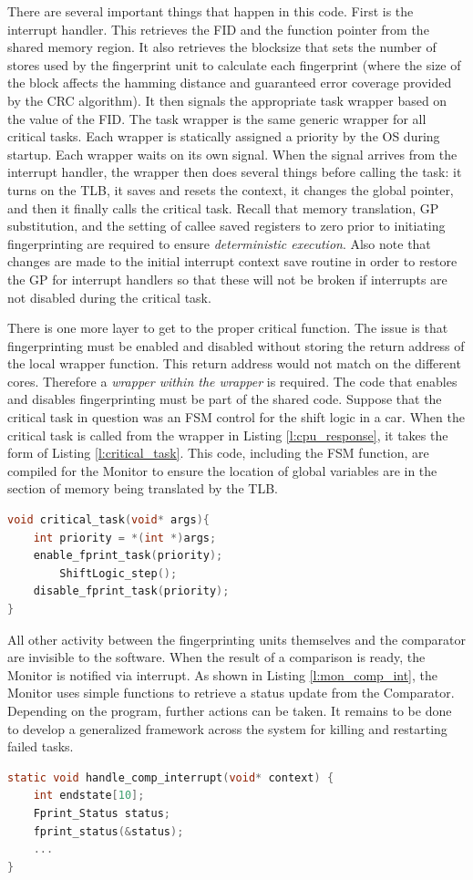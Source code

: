 There are several important things that happen in this code. First is the interrupt handler. This retrieves the FID and the function pointer from the shared memory region. It also retrieves the blocksize that sets the number of stores used by the fingerprint unit to calculate each fingerprint (where the size of the block affects the hamming distance and guaranteed error coverage provided by the CRC algorithm). It then signals the appropriate task wrapper based on the value of the FID. The task wrapper is the same generic wrapper for all critical tasks. Each wrapper is statically assigned a priority by the OS during startup. Each wrapper waits on its own signal. When the signal arrives from the interrupt handler, the wrapper then does several things before calling the task: it turns on the TLB, it saves and resets the context, it changes the global pointer, and then it finally calls the critical task. Recall that memory translation, GP substitution, and the setting of callee saved registers to zero prior to initiating fingerprinting are required to ensure \emph{deterministic execution}. Also note that changes are made to the initial interrupt context save routine in order to restore the GP for interrupt handlers so that these will not be broken if interrupts are not disabled during the critical task.

There is one more layer to get to the proper critical function. The issue is that fingerprinting must be enabled and disabled without storing the return address of the local wrapper function. This return address would not match on the different cores. Therefore a \emph{wrapper within the wrapper} is required. The code that enables and disables fingerprinting must be part of the shared code. Suppose that the critical task in question was an FSM control for the shift logic in a car. When the critical task is called from the wrapper in Listing \ref{l:cpu_response}, it takes the form of Listing \ref{l:critical_task}. This code, including the FSM function, are compiled for the Monitor to ensure the location of global variables are in the section of memory being translated by the TLB.

\begin{lstlisting}[frame=single,language=C,label=l:critical_task,caption=The inner layer wrapper.]
void critical_task(void* args){
	int priority = *(int *)args;
	enable_fprint_task(priority);
	    ShiftLogic_step();
	disable_fprint_task(priority);
}
\end{lstlisting}

All other activity between the fingerprinting units themselves and the comparator are invisible to the software. When the result of a comparison is ready, the Monitor is notified via interrupt. As shown in Listing \ref{l:mon_comp_int}, the Monitor uses simple functions to retrieve a status update from the Comparator. Depending on the program, further actions can be taken. It remains to be done to develop a generalized framework across the system for killing and restarting failed tasks.

\begin{lstlisting}[frame=single,language=C,label=l:mon_comp_int,caption=The monitor interrupt handler for the comparator]
static void handle_comp_interrupt(void* context) {
	int endstate[10];
	Fprint_Status status;
	fprint_status(&status);
	...
}
\end{lstlisting}